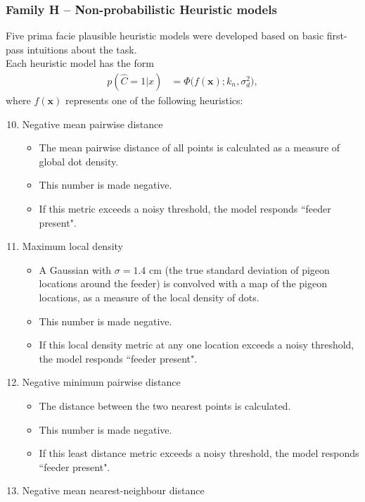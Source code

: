 \documentclass{article}
\begin{document}
\subsubsection*{Family H -- Non-probabilistic Heuristic models}
Five prima facie plausible heuristic models were developed based on basic first-pass intuitions about the task. \\
Each heuristic model has the form
\begin{align*}
    p(\hat{C}=1|x) &= \Phi\Big(f(\mathbf{x});k_n,\sigma_d^2\Big),
\end{align*}
where $f(\mathbf{x})$ represents one of the following heuristics:
\begin{enumerate}[label=H(\arabic*)]
\setcounter{enumi}{9}
\item Negative mean pairwise distance
\begin{itemize}
    \item The mean pairwise distance of all points is calculated as a measure of global dot density.
    \item This number is made negative.
    \item If this metric exceeds a noisy threshold, the model responds ``feeder present".
\end{itemize} 
\item Maximum local density
\begin{itemize}
    \item A Gaussian with $\sigma = 1.4$ cm (the true standard deviation of pigeon locations around the  feeder) is convolved with a map of the pigeon locations, as a measure of the local density of dots.
    \item This number is made negative.
    \item If this local density metric at any one location exceeds a noisy threshold, the model responds ``feeder present".
\end{itemize} 
\item Negative minimum pairwise distance
\begin{itemize}
    \item The distance between the two nearest points is calculated. 
    \item This number is made negative.
    \item If this least distance metric exceeds a noisy threshold, the model responds ``feeder present".
\end{itemize} 
\item Negative mean nearest-neighbour distance
\begin{itemize}

\end{itemize}
\end{enumerate}
\end{document}
